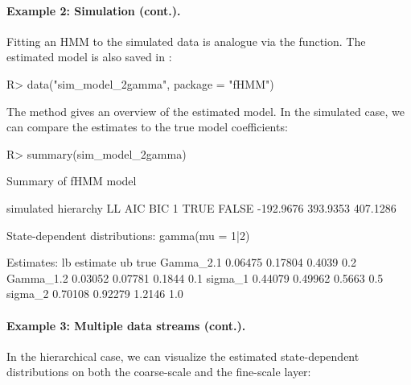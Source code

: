 \documentclass[article,shortnames]{jss}
\newcommand{\fct}[1]{\code{#1()}}
\begin{document}
\paragraph{Example 2: Simulation (cont.).} Fitting an HMM to the simulated data is analogue via the \fct{fit\_model} function. The estimated model  is also saved in : 

%
\begin{Schunk}
\begin{Sinput}
R> data("sim_model_2gamma", package = "fHMM")
\end{Sinput}
\end{Schunk}
%

The \fct{summary} method gives an overview of the estimated model. In the simulated case, we can compare the estimates to the true model coefficients:

%
\begin{Schunk}
\begin{Sinput}
R> summary(sim_model_2gamma)
\end{Sinput}
\begin{Soutput}
Summary of fHMM model

  simulated hierarchy        LL      AIC      BIC
1      TRUE     FALSE -192.9676 393.9353 407.1286

State-dependent distributions:
gamma(mu = 1|2) 

Estimates:
               lb estimate     ub true
Gamma_2.1 0.06475  0.17804 0.4039  0.2
Gamma_1.2 0.03052  0.07781 0.1844  0.1
sigma_1   0.44079  0.49962 0.5663  0.5
sigma_2   0.70108  0.92279 1.2146  1.0
\end{Soutput}
\end{Schunk}
%

\paragraph{Example 3: Multiple data streams (cont.).}

In the hierarchical case, we can visualize the estimated state-dependent distributions on both the coarse-scale and the fine-scale layer:
\end{document}
